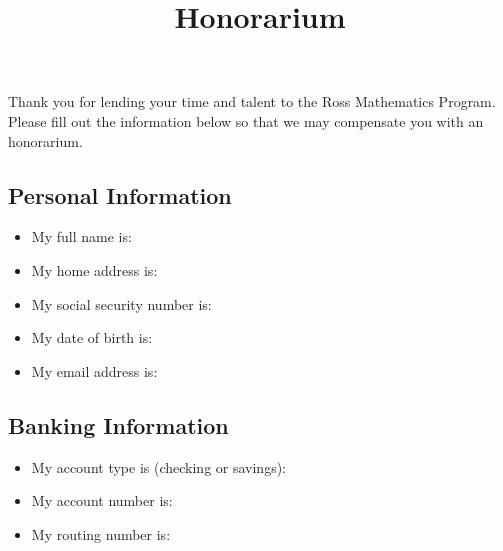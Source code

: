\documentclass{ross}
\title{Honorarium}
\begin{document}
\maketitle

Thank you for lending your time and talent to the Ross Mathematics Program. Please fill out the information below so that we may compensate you with an honorarium. 

\subsection*{Personal Information}

\begin{itemize}[label={$\blackpointerright$}]
    \item My full name is: \hfill \genblank[name]{\phantom{\hspace{3in}}}
    \item My home address is: \hfill \genblank[address]{\phantom{\hspace{3in}}}
    \item My social security number is: \hfill \genblank[SSN]{\phantom{\hspace{3in}}}
    \item My date of birth is: \hfill \genblank[birthday]{\phantom{\hspace{3in}}}
    \item My email address is: \hfill \genblank[email]{\phantom{\hspace{3in}}}
\end{itemize}

\subsection*{Banking Information}
\begin{itemize}[label={$\blackpointerright$}]
    \item My account type is (checking or savings): \hfill {}
    \item My account number is: \hfill {}
    \item My routing number is: \hfill {}
\end{itemize}

   
\end{document}
